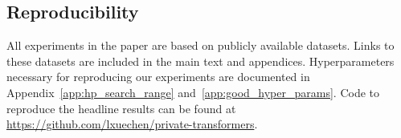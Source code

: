 \subsection*{Reproducibility}
All experiments in the paper are based on publicly available datasets. Links to these datasets are included in the main text and appendices. 
Hyperparameters necessary for reproducing our experiments are documented in Appendix~\ref{app:hp_search_range} and~\ref{app:good_hyper_params}.
Code to reproduce the headline results can be found at \url{https://github.com/lxuechen/private-transformers}.

